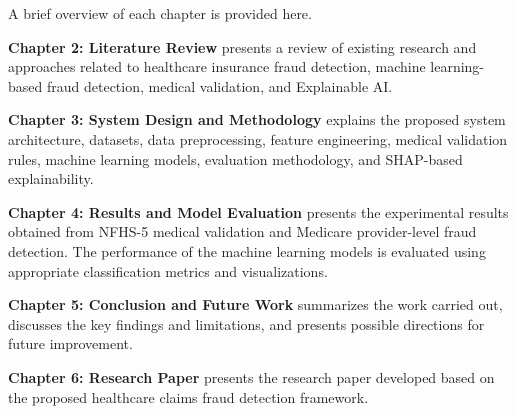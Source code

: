 A brief overview of each chapter is provided here.

\textbf{Chapter 2: Literature Review} presents a review of existing research and approaches related to healthcare insurance fraud detection, machine learning-based fraud detection, medical validation, and Explainable AI.

\textbf{Chapter 3: System Design and Methodology} explains the proposed system architecture, datasets, data preprocessing, feature engineering, medical validation rules, machine learning models, evaluation methodology, and SHAP-based explainability.

\textbf{Chapter 4: Results and Model Evaluation} presents the experimental results obtained from NFHS-5 medical validation and Medicare provider-level fraud detection. The performance of the machine learning models is evaluated using appropriate classification metrics and visualizations.

\textbf{Chapter 5: Conclusion and Future Work} summarizes the work carried out, discusses the key findings and limitations, and presents possible directions for future improvement.

\textbf{Chapter 6: Research Paper} presents the research paper developed based on the proposed healthcare claims fraud detection framework.
